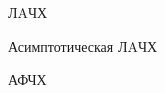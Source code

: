 \documentclass[a4paper, 12pt]{article}
\begin{document}
\begin{figure}[h!]
	\caption{ЛAЧХ}
	\label{1lachh}
\end{figure}

\newpage

\begin{figure}[h!]
	\caption{Асимптотическая ЛAЧХ}
	\label{1alachh}
\end{figure}


\begin{figure}[h!]
	\caption{АФЧХ}
	\label{1afchh}
\end{figure}
\end{document}

